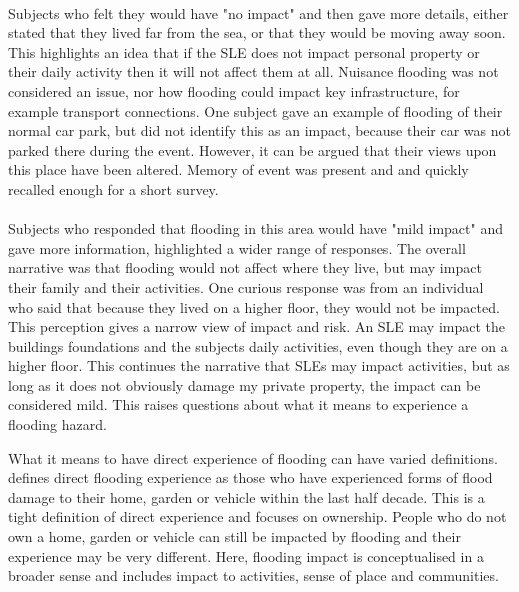 \paragraph{}

Subjects who felt they would have "no impact" and then gave more details, either stated that they lived far from the sea, or that they would be moving away soon. This highlights an idea that if the SLE does not impact personal property or their daily activity then it will not affect them at all. Nuisance flooding was not considered an issue, nor how flooding could impact key infrastructure, for example transport connections. One subject gave an example of flooding of their normal car park, but did not identify this as an impact, because their car was not parked there during the event. However, it can be argued that their views upon this place have been altered. Memory of event was present and and quickly recalled enough for a short survey.  
\paragraph{}

Subjects who responded that flooding in this area would have "mild impact" and gave more information, highlighted a wider range of responses. The overall narrative was that flooding would not affect where they live, but may impact their family and their activities. One curious response was from an individual who said that because they lived on a higher floor, they would not be impacted. This perception gives a narrow view of impact and risk. An SLE may impact the buildings foundations and the subjects daily activities, even though they are on a higher floor. This continues the narrative that SLEs may impact activities, but as long as it does not obviously damage my private property, the impact can be considered mild. This raises questions about what it means to experience a flooding hazard. 

What it means to have direct experience of flooding can have varied definitions. \cite{whitmarsh_are_2008} defines direct flooding experience as those who have experienced forms of flood damage to their home, garden or vehicle within the last half decade. This is a tight definition of direct experience and focuses on ownership. People who do not own a home, garden or vehicle can still be impacted by flooding and their experience may be very different. Here, flooding impact is conceptualised in a broader sense and includes impact to activities, sense of place and communities.   
